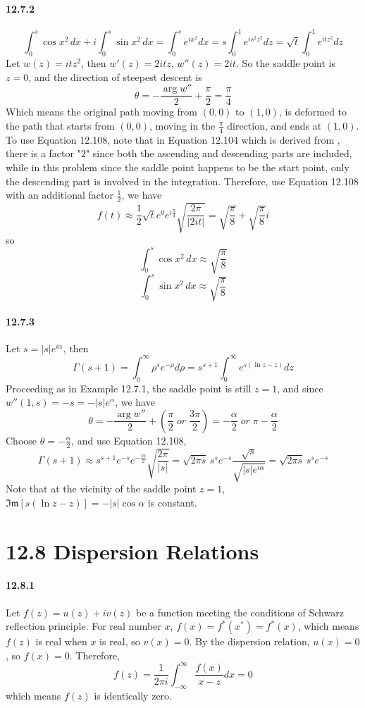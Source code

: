 \documentclass[a4paper]{article}
\begin{document}
\paragraph{12.7.2}
\[
\int_0^s\cos x^2\,dx+i\int_0^s\sin x^2\,dx=\int_0^s e^{ix^2}dx=s\int_0^1 e^{is^2z^2}dz=\sqrt{t}\int_0^1 e^{itz^2}dz
\]
Let $w(z)=itz^2$, then $w'(z)=2itz$,\; $w''(z)=2it$. So the saddle point is $z=0$, and the direction of steepest descent is
\[
\theta=-\frac{\arg w''}{2}+\frac{\pi}{2}=\frac{\pi}{4}
\]
Which means the original path moving from $(0,0)$ to $(1,0)$, is deformed to the path that starts from $(0,0)$, moving in the $\frac{\pi}{4}$ direction, and ends at $(1,0)$. To use Equation 12.108, note that in Equation 12.104 which is derived from , there is a factor "$2$" since both the ascending and descending parts are included, while in this problem since the saddle point happens to be the start point, only the descending part is involved in the integration. Therefore, use Equation 12.108 with an additional factor $\frac{1}{2}$, we have
\[
f(t)\approx\frac{1}{2}\sqrt{t}e^0e^{i\frac{\pi}{4}}\sqrt{\frac{2\pi}{|2it|}}=\sqrt{\frac{\pi}{8}}+\sqrt{\frac{\pi}{8}}i
\]
so
\[
\int_0^s\cos x^2\,dx\approx\sqrt{\frac{\pi}{8}}
\]
\[
\int_0^s\sin x^2\,dx\approx\sqrt{\frac{\pi}{8}}
\]

\paragraph{12.7.3}
Let $s=|s|e^{i\alpha}$, then
\[
\Gamma(s+1)=\int_0^\infty \rho^s e^{-\rho}d\rho=s^{s+1}\int_0^\infty e^{s(\ln z-z)}dz
\]
Proceeding as in Example 12.7.1, the saddle point is still $z=1$, and since $w''(1,s)=-s=-|s|e^{\alpha}$, we have
\[
\theta=-\frac{\arg w''}{2}+(\frac{\pi}{2}\; or\; \frac{3\pi}{2})=-\frac{\alpha}{2}\; or\; \pi-\frac{\alpha}{2}
\]
Choose $\theta=-\frac{\alpha}{2}$, and use Equation 12.108,
\[
\Gamma(s+1)\approx s^{s+1}e^{-s}e^{-\frac{i\alpha}{2}}\sqrt{\frac{2\pi}{|s|}}=\sqrt{2\pi s}\,s^se^{-s}\frac{\sqrt{s}}{\sqrt{|s|e^{i\alpha}}}=\sqrt{2\pi s}\,s^se^{-s}
\]
Note that at the vicinity of the saddle point $z=1$,\; $\mathfrak{Im}[s(\ln z-z)]=-|s|\cos\alpha$ is constant.

\section*{12.8 Dispersion Relations}
\paragraph{12.8.1}
Let $f(z)=u(z)+iv(z)$ be a function meeting the conditions of Schwarz reflection principle. For real number $x$,\; $f(x)=f^*(x^*)=f^*(x)$, which means $f(z)$ is real when $x$ is real, so $v(x)=0$. By the dispersion relation, $u(x)=0$, so $f(x)=0$. Therefore,
\[
f(z)=\frac{1}{2\pi i}\int_{-\infty}^\infty\frac{f(x)}{x-z}dx=0
\]
which means $f(z)$ is identically zero.
\end{document}
